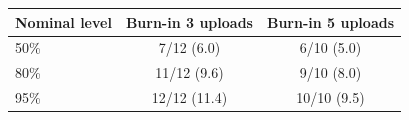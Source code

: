 {\small
\begin{tabular}{@{}lcc@{}}
\toprule
Nominal level & Burn-in 3 uploads & Burn-in 5 uploads \\
\midrule
50\% & 7/12 (6.0) & 6/10 (5.0) \\
80\% & 11/12 (9.6) & 9/10 (8.0) \\
95\% & 12/12 (11.4) & 10/10 (9.5) \\
\bottomrule
\end{tabular}
}
